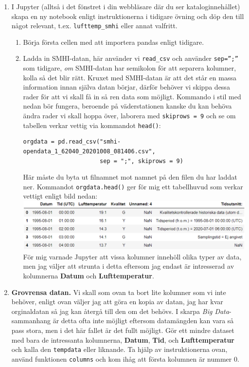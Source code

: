 \documentclass{article}
\begin{document}
\begin{enumerate}
\begin{enumerate}
    \end{enumerate}
    \item I Jupyter (alltså i det fönstret i din webbläsare där du ser kataloginnehållet) skapa en ny notebook enligt instruktionerna i tidigare övning och döp den till något relevant, t.ex. \verb+lufttemp_smhi+ eller annat valfritt.
    \begin{enumerate}
        \item Börja första cellen med att importera pandas enligt tidigare.
        \item Ladda in SMHI-datan, här använder vi \verb+read_csv+ och använder \verb+sep=”;”+ som tidigare, \emph{om} SMHI-datan har semikolon för att separera kolumner, kolla så det blir rätt. Kruxet med SMHI-datan är att det står en massa information innan själva datan börjar, därför behöver vi skippa dessa rader för att vi skall få in så ren data som möjligt. Kommando i stil med nedan bör fungera, beroende på väderstationen kanske du kan behöva ändra rader vi skall hoppa över, laborera med \verb+skiprows = 9+ och se om tabellen verkar vettig via kommandot \verb+head()+:
        \begin{verbatim}
orgdata = pd.read_csv("smhi-opendata_1_62040_20201008_081406.csv",
                      sep = ";", skiprows = 9)
        \end{verbatim}
        Här måste du byta ut filnamnet mot namnet på den filen du har laddat ner. Kommandot \verb+orgdata.head()+ ger för mig ett tabellhuvud som verkar vettigt enligt bild nedan:\\
\includegraphics[width=\textwidth]{figures/anaconda9.png}\\
    För mig varnade Jupyter att vissa kolumner innehöll olika typer av data, men jag väljer att strunta i detta eftersom jag endast är intresserad av kolumnerna \textbf{Datum} och \textbf{Lufttemperatur}.
\end{enumerate}
\item \textbf{Grovrensa datan.} Vi skall som ovan ta bort lite kolumner som vi inte behöver, enligt ovan väljer jag att göra en kopia av datan, jag har kvar orginaldatan så jag kan återgå till den om det behövs. I skarpa \emph{Big Data}-sammanhang är detta ofta inte möjligt eftersom datamängden kan vara så pass stora, men i det här fallet är det fullt möjligt. Gör ett mindre dataset med bara de intressanta kolumnerna, \textbf{Datum}, \textbf{Tid}, och \textbf{Lufttemperatur} och kalla den \verb+tempdata+ eller liknande. Ta hjälp av instruktionerna ovan, använd funktionen \verb+columns+ och kom ihåg att första kolumnen är nummer 0. 

\end{enumerate}
\end{document}
